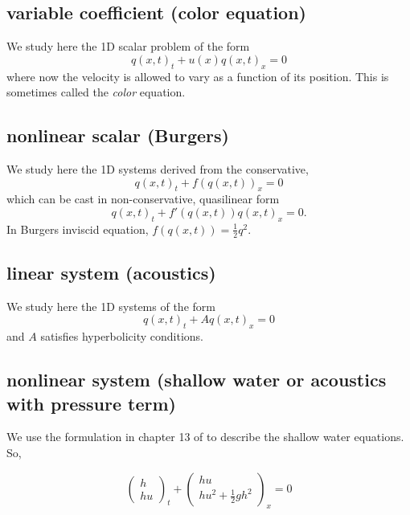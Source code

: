 \documentclass[12pt,leqno]{article}
\begin{document}
\subsection{variable coefficient (color equation)}
We study here the 1D scalar problem of the form
\begin{equation}
q(x,t)_{t} + u(x) q(x,t)_{x}=0
\end{equation}
\noindent where now the velocity is allowed to vary as a function of its position. This is sometimes called the {\it color} equation.

\subsection{nonlinear scalar (Burgers)}
We study here the 1D systems derived from the conservative, 
\begin{equation}
q(x,t)_{t} + f(q(x,t))_{x}=0
\end{equation}
which can be cast in non-conservative, quasilinear form 
 \begin{equation}
q(x,t)_{t} + f'(q(x,t))q(x,t)_{x}=0 .
\end{equation}
In Burgers inviscid equation, $f(q(x,t))=\frac{1}{2}q^2$.

\subsection{linear system (acoustics)}
We study here the 1D systems of the form
\begin{equation}
q(x,t)_{t} + A q(x,t)_{x}=0
\end{equation}
\noindent and $A$ satisfies hyperbolicity conditions.

\subsection{nonlinear system (shallow water or acoustics with pressure term)}
We use the formulation in chapter 13 of \cite{levFVMHP} to describe the shallow water equations.
So, 

\begin{equation}
\left( \begin{array}{c}
h  \\
h u\end{array} \right)_{t} + 
\left( \begin{array}{c} 
hu \\
hu^2 + \frac{1}{2}gh^2\end{array} \right)_{x} = 0
\end{equation}
\end{document}

